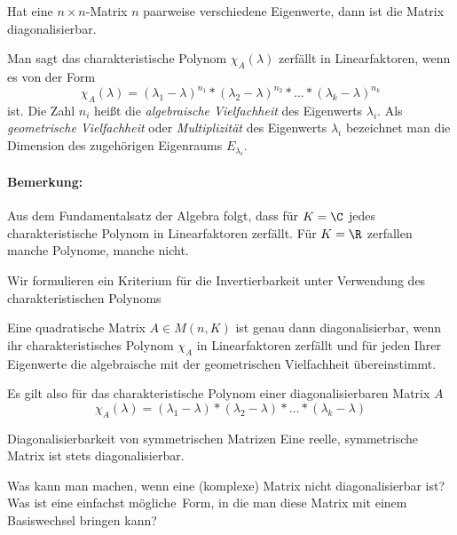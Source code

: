 \begin{korollar}{}
	Hat eine $n\times n$-Matrix $n$ paarweise verschiedene Eigenwerte, dann ist die Matrix diagonalisierbar.
\end{korollar}

\begin{definition}{}
	Man sagt das charakteristische Polynom $\chi_A(\lambda)$ zerfällt in Linearfaktoren, wenn es von der Form
	\begin{equation*}
		\chi_A(\lambda)=(\lambda_1-\lambda)^{n_1}*(\lambda_2-\lambda)^{n_2}*\ldots*(\lambda_k-\lambda)^{n_k}
	\end{equation*}
	ist. Die Zahl $n_i$ heißt die \emph{algebraische Vielfachheit} des Eigenwerts $\lambda_i$. Als \emph{geometrische Vielfachheit} oder \emph{Multiplizität} des Eigenwerts $\lambda_i$ bezeichnet man die Dimension des zugehörigen Eigenraums $E_{\lambda_i}$.
\end{definition}
\paragraph{Bemerkung:}
Aus dem Fundamentalsatz der Algebra folgt, dass für $K=\C$ jedes charakteristische Polynom in Linearfaktoren zerfällt. Für $K=\R$ zerfallen manche Polynome, manche nicht.

Wir formulieren ein Kriterium für die Invertierbarkeit unter Verwendung des charakteristischen Polynoms
\begin{satz}{}
	Eine quadratische Matrix $A\in M(n,K)$ ist genau dann diagonalisierbar, wenn ihr charakteristisches Polynom $\chi_A$ in Linearfaktoren zerfällt und für jeden Ihrer Eigenwerte die algebraische mit der geometrischen Vielfachheit übereinstimmt.
\end{satz}
Es gilt also für das charakteristische Polynom einer diagonalisierbaren Matrix $A$
\begin{equation*}
	\chi_A(\lambda)=(\lambda_1-\lambda)*(\lambda_2-\lambda)*\ldots*(\lambda_k-\lambda)
\end{equation*}

\begin{satz}{Diagonalisierbarkeit von symmetrischen Matrizen}
	Eine reelle, symmetrische Matrix ist stets diagonalisierbar.
\end{satz}
Was kann man machen, wenn eine (komplexe) Matrix nicht diagonalisierbar ist? Was ist eine \glqq einfachst mögliche\grqq\ Form, in die man diese Matrix mit einem Basiswechsel bringen kann?


